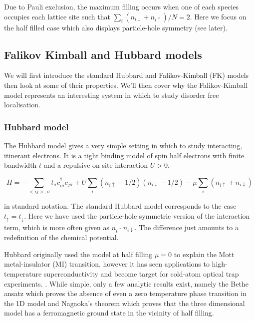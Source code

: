 Due to Pauli exclusion, the maximum filling occurs when one of each species occupies each lattice site such that \(\sum_i (n_{i\downarrow} + n_{i\uparrow} )/ N = 2\). Here we focus on the half filled case which also displays particle-hole symmetry (see later).

\hypertarget{falikov-kimball-and-hubbard-models}{%
\subsection{Falikov Kimball and Hubbard models}\label{falikov-kimball-and-hubbard-models}}

We will first introduce the standard Hubbard and Falikov-Kimball (FK) models then look at some of their properties. We'll then cover why the Falikov-Kimball model represents an interesting system in which to study disorder free localisation.

\hypertarget{hubbard-model}{%
\subsubsection{Hubbard model}\label{hubbard-model}}

The Hubbard model gives a very simple setting in which to study interacting, itinerant electrons. It is a tight binding model of spin half electrons with finite bandwidth \(t\) and a repulsive on-site interaction \(U > 0\).

\[
    H = -\sum_{<ij>,\sigma} t_{\sigma} c^\dagger_{i\sigma}c_{j\sigma} + U \sum_{i} (n_{i \uparrow} - 1/2)( n_{i\downarrow} - 1/2) - \mu \sum_i \left( n_{i \uparrow} + n_{i \downarrow} \right)
\]

in standard notation. The standard Hubbard model corresponds to the case \(t_{\uparrow} = t_{\downarrow}\). Here we have used the particle-hole symmetric version of the interaction term, which is more often given as \(n_{i \uparrow} n_{i\downarrow}\). The difference just amounts to a redefinition of the chemical potential.

Hubbard originally used the model at half filling \(\mu = 0\) to explain the Mott metal-insulator (MI) transition, however it has seen applications to high-temperature superconductivity and become target for cold-atom optical trap experiments. \autocite{HubbardModelHalf2013,greiner_quantum_2002,jordens_mott_2008}. While simple, only a few analytic results exist, namely the Bethe ansatz \autocite{liebAbsenceMottTransition1968} which proves the absence of even a zero temperature phase transition in the 1D model and Nagaoka's theorem \autocite{nagaokaFerromagnetismNarrowAlmost1966} which proves that the three dimensional model has a ferromagnetic ground state in the vicinity of half filling.

